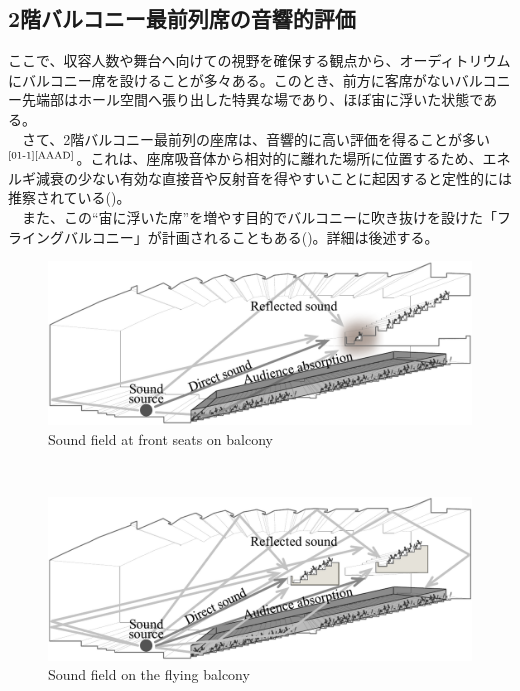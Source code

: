 \subsection{2階バルコニー最前列席の音響的評価}
ここで、収容人数や舞台へ向けての視野を確保する観点から、オーディトリウムにバルコニー席を設けることが多々ある。このとき、前方に客席がないバルコニー先端部はホール空間へ張り出した特異な場であり、ほぼ宙に浮いた状態である。
\\　さて、2階バルコニー最前列の座席は、音響的に高い評価を得ることが多い$^{\text{\cite{01-1}{\cite{AAAD}}}}$。これは、座席吸音体から相対的に離れた場所に位置するため、エネルギ減衰の少ない有効な直接音や反射音を得やすいことに起因すると定性的には推察されている()。
\\　また、この“宙に浮いた席”を増やす目的でバルコニーに吹き抜けを設けた「フライングバルコニー」が計画されることもある()。詳細は後述する。
\\
\begin{figure}[h]
    \centering
    \includegraphics[keepaspectratio,scale=0.6]{01_att/2ndbalcony.pdf}
    \caption{\hspace{1mm}Sound field at front seats on balcony}
    \label{fig:2ndbalcony}
\end{figure}
\\
\begin{figure}[h]
    \centering
    \includegraphics[keepaspectratio,scale=0.6]{01_att/2ndflyingbalcony.pdf}
    \caption{\hspace{1mm}Sound field on the flying balcony}
    \label{fig:2ndflyingbalcony}
\end{figure}

